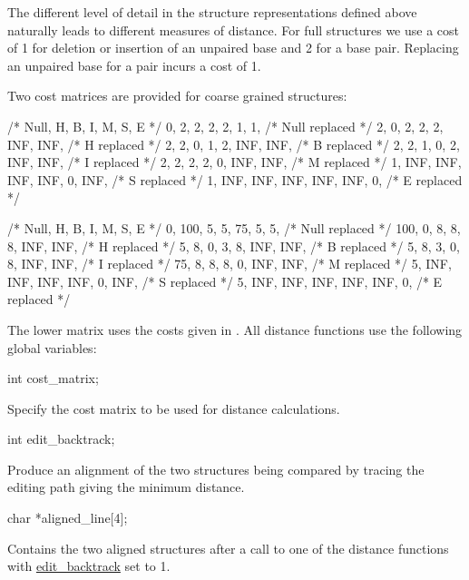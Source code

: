 The different level of detail in the structure representations defined above naturally leads to different measures of distance. For full structures we use a cost of 1 for deletion or insertion of an unpaired base and 2 for a base pair. Replacing an unpaired base for a pair incurs a cost of 1.

Two cost matrices are provided for coarse grained structures\+:

\begin{DoxyVerb}/*  Null,   H,   B,   I,   M,   S,   E    */
   {   0,   2,   2,   2,   2,   1,   1},   /* Null replaced */
   {   2,   0,   2,   2,   2, INF, INF},   /* H    replaced */
   {   2,   2,   0,   1,   2, INF, INF},   /* B    replaced */
   {   2,   2,   1,   0,   2, INF, INF},   /* I    replaced */
   {   2,   2,   2,   2,   0, INF, INF},   /* M    replaced */
   {   1, INF, INF, INF, INF,   0, INF},   /* S    replaced */
   {   1, INF, INF, INF, INF, INF,   0},   /* E    replaced */


/* Null,   H,   B,   I,   M,   S,   E   */
   {   0, 100,   5,   5,  75,   5,   5},   /* Null replaced */
   { 100,   0,   8,   8,   8, INF, INF},   /* H    replaced */
   {   5,   8,   0,   3,   8, INF, INF},   /* B    replaced */
   {   5,   8,   3,   0,   8, INF, INF},   /* I    replaced */
   {  75,   8,   8,   8,   0, INF, INF},   /* M    replaced */
   {   5, INF, INF, INF, INF,   0, INF},   /* S    replaced */
   {   5, INF, INF, INF, INF, INF,   0},   /* E    replaced */
\end{DoxyVerb}


The lower matrix uses the costs given in \cite{shapiro:1990}. All distance functions use the following global variables\+:

\begin{DoxyVerb}int  cost_matrix;
\end{DoxyVerb}
 Specify the cost matrix to be used for distance calculations.

\begin{DoxyVerb}int   edit_backtrack;
\end{DoxyVerb}
 Produce an alignment of the two structures being compared by tracing the editing path giving the minimum distance.

\begin{DoxyVerb}char *aligned_line[4];
\end{DoxyVerb}
 Contains the two aligned structures after a call to one of the distance functions with \hyperlink{dist__vars_8h_aa03194c513af6b860e7b33e370b82bdb}{edit\+\_\+backtrack} set to 1.

